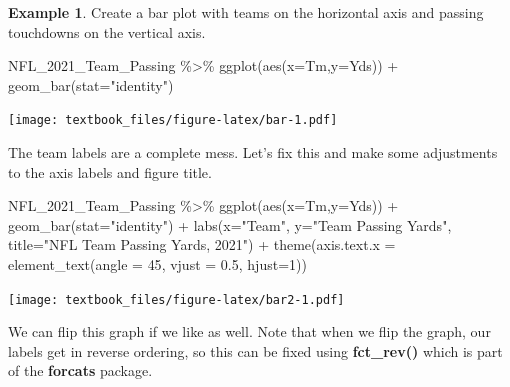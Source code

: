 \documentclass[
  11pt,
]{book}
\newenvironment{Shaded}{\begin{snugshade}}{\end{snugshade}}
\newcommand{\AttributeTok}[1]{\textcolor[rgb]{0.77,0.63,0.00}{#1}}
\newcommand{\DecValTok}[1]{\textcolor[rgb]{0.00,0.00,0.81}{#1}}
\newcommand{\FloatTok}[1]{\textcolor[rgb]{0.00,0.00,0.81}{#1}}
\newcommand{\FunctionTok}[1]{\textcolor[rgb]{0.00,0.00,0.00}{#1}}
\newcommand{\NormalTok}[1]{#1}
\newcommand{\SpecialCharTok}[1]{\textcolor[rgb]{0.00,0.00,0.00}{#1}}
\newcommand{\StringTok}[1]{\textcolor[rgb]{0.31,0.60,0.02}{#1}}
\theoremstyle{definition}
\theoremstyle{definition}
\newtheorem{example}{Example}[chapter]
\theoremstyle{definition}
\theoremstyle{definition}
\theoremstyle{remark}
\begin{document}
\begin{example}
Create a bar plot with teams on the horizontal axis and passing touchdowns on the vertical axis.

\begin{Shaded}
\begin{Highlighting}[]
\NormalTok{NFL\_2021\_Team\_Passing }\SpecialCharTok{\%\textgreater{}\%} 
  \FunctionTok{ggplot}\NormalTok{(}\FunctionTok{aes}\NormalTok{(}\AttributeTok{x=}\NormalTok{Tm,}\AttributeTok{y=}\NormalTok{Yds)) }\SpecialCharTok{+}
  \FunctionTok{geom\_bar}\NormalTok{(}\AttributeTok{stat=}\StringTok{"identity"}\NormalTok{)}
\end{Highlighting}
\end{Shaded}

\texttt{[image: textbook\_files/figure-latex/bar-1.pdf]}

\vfill
\newpage

The team labels are a complete mess. Let's fix this and make some adjustments to the axis labels and figure title.

\begin{Shaded}
\begin{Highlighting}[]
\NormalTok{NFL\_2021\_Team\_Passing }\SpecialCharTok{\%\textgreater{}\%} 
  \FunctionTok{ggplot}\NormalTok{(}\FunctionTok{aes}\NormalTok{(}\AttributeTok{x=}\NormalTok{Tm,}\AttributeTok{y=}\NormalTok{Yds)) }\SpecialCharTok{+}
  \FunctionTok{geom\_bar}\NormalTok{(}\AttributeTok{stat=}\StringTok{"identity"}\NormalTok{) }\SpecialCharTok{+} 
  \FunctionTok{labs}\NormalTok{(}\AttributeTok{x=}\StringTok{"Team"}\NormalTok{, }\AttributeTok{y=}\StringTok{"Team Passing Yards"}\NormalTok{, }
       \AttributeTok{title=}\StringTok{"NFL Team Passing Yards, 2021"}\NormalTok{) }\SpecialCharTok{+}
  \FunctionTok{theme}\NormalTok{(}\AttributeTok{axis.text.x =} \FunctionTok{element\_text}\NormalTok{(}\AttributeTok{angle =} \DecValTok{45}\NormalTok{, }\AttributeTok{vjust =} \FloatTok{0.5}\NormalTok{, }\AttributeTok{hjust=}\DecValTok{1}\NormalTok{))}
\end{Highlighting}
\end{Shaded}

\texttt{[image: textbook\_files/figure-latex/bar2-1.pdf]}

\vfill
\newpage

We can flip this graph if we like as well. Note that when we flip the graph, our labels get in reverse ordering, so this can be fixed using \textbf{fct\_rev()} which is part of the \textbf{forcats} package.


\end{example}
\end{document}
